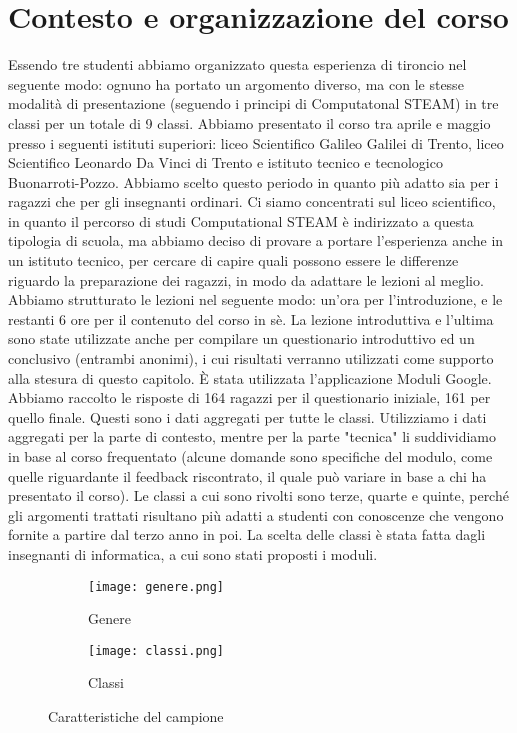 \section{Contesto e organizzazione del corso}
Essendo tre studenti abbiamo organizzato questa esperienza di tironcio nel seguente modo: ognuno ha portato un argomento diverso, ma con le stesse modalità di presentazione (seguendo i principi di Computatonal STEAM) in tre classi per un totale di 9 classi.
Abbiamo presentato il corso tra aprile e maggio presso i seguenti istituti superiori: liceo Scientifico Galileo Galilei di Trento, liceo Scientifico Leonardo Da Vinci di Trento e istituto tecnico e tecnologico Buonarroti-Pozzo. Abbiamo scelto questo periodo in quanto più adatto sia per i ragazzi che per gli insegnanti ordinari. Ci siamo concentrati sul liceo scientifico, in quanto il percorso di studi Computational STEAM è indirizzato a questa tipologia di scuola, ma abbiamo deciso di provare a portare l’esperienza anche in un istituto tecnico, per cercare di capire quali possono essere le differenze riguardo la preparazione dei ragazzi, in modo da adattare le lezioni al meglio. Abbiamo strutturato le lezioni nel seguente modo: un’ora per l’introduzione, e le restanti 6 ore per il contenuto del corso in sè. La lezione introduttiva e l’ultima sono state utilizzate anche per compilare un questionario introduttivo ed un conclusivo (entrambi anonimi), i cui risultati verranno utilizzati come supporto alla stesura di questo capitolo. È stata utilizzata l’applicazione Moduli Google. Abbiamo raccolto le risposte di 164 ragazzi per il questionario iniziale, 161 per quello finale. Questi sono i dati aggregati per tutte le classi. Utilizziamo i dati aggregati per la parte  di contesto, mentre per la parte "tecnica" li suddividiamo in base al corso frequentato (alcune domande sono specifiche del modulo, come quelle riguardante il feedback riscontrato, il quale può variare in base a chi ha presentato il corso).
Le classi a cui sono rivolti sono terze, quarte e quinte, perché gli argomenti trattati risultano più adatti a studenti con conoscenze che vengono fornite a partire dal terzo anno in poi. La scelta delle classi è stata fatta dagli insegnanti di informatica, a cui sono stati proposti i moduli.
\begin{figure}[!h]
    \begin{subfigure}{.5\textwidth}
        \centering
        \texttt{[image: genere.png]}
        \caption{Genere}
        \label{fig:genere}
    \end{subfigure}\hfill
    \begin{subfigure}{.5\textwidth}
        \centering
        \texttt{[image: classi.png]}
        \caption{Classi}
        \label{fig:classi}
    \end{subfigure}
    \caption{Caratteristiche del campione} 
\end{figure}
